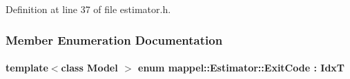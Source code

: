 Definition at line 37 of file estimator.\+h.



\subsubsection{Member Enumeration Documentation}
\paragraph[{\texorpdfstring{Exit\+Code}{ExitCode}}]{\setlength{\rightskip}{0pt plus 5cm}template$<$class Model $>$ enum {\bf mappel\+::\+Estimator\+::\+Exit\+Code} \+: {\bf IdxT}\hspace{0.3cm}{\ttfamily [strong]}}\hypertarget{classmappel_1_1Estimator_a6d599915907ba4d0607fcb958d231edc}{}\label{classmappel_1_1Estimator_a6d599915907ba4d0607fcb958d231edc}
